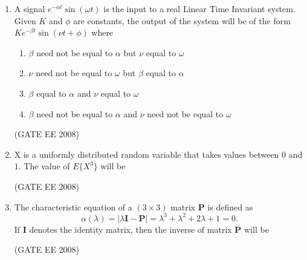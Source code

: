 \documentclass[journal,12pt,onecolumn]{IEEEtran}
\theoremstyle{remark}
\begin{document}
\begin{enumerate}[start=1, label=Q.\arabic*]
\item A signal $e^{-\alpha t} \sin(\omega t)$ is the input to a real Linear Time Invariant system. 
Given $K$ and $\phi$ are constants, the output of the system will be of the form 
$K e^{-\beta t} \sin(\nu t + \phi)$ where
\begin{enumerate}[label=(\Alph*)]
\item $\beta$ need not be equal to $\alpha$ but $\nu$ equal to $\omega$
    \item $\nu$ need not be equal to $\omega$ but $\beta$ equal to $\alpha$
    \item $\beta$ equal to $\alpha$ and $\nu$ equal to $\omega$
    \item $\beta$ need not be equal to $\alpha$ and $\nu$ need not be equal to $\omega$
\end{enumerate}
\hfill (GATE EE 2008)




\item X is a uniformly distributed random variable that takes values between $0$ and $1$. 
The value of $E\{X^3\}$ will be %
\begin{enumerate}[label=(\Alph*)]
\end{enumerate}
\hfill (GATE EE 2008)




\item The characteristic equation of a $(3 \times 3)$ matrix $\mathbf{P}$ is defined as
\[
\alpha(\lambda) = \lvert \lambda \mathbf{I} - \mathbf{P} \rvert 
= \lambda^3 + \lambda^2 + 2\lambda + 1 = 0.
\] %
If $\mathbf{I}$ denotes the identity matrix, then the inverse of matrix $\mathbf{P}$ will be

\begin{enumerate}[label=(\Alph*)]
\end{enumerate}
\hfill (GATE EE 2008)





\end{enumerate}
\end{document}
